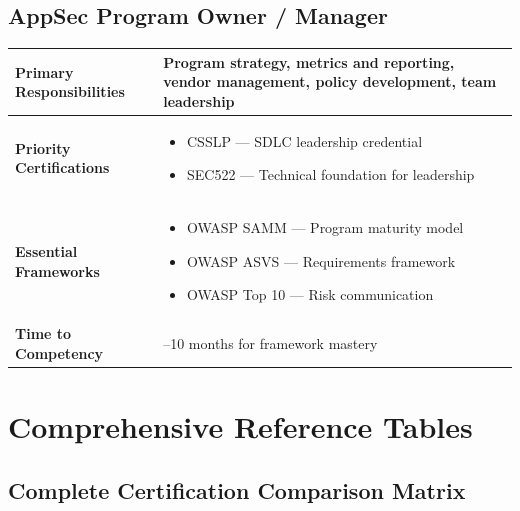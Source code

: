 \documentclass[11pt,letterpaper]{article}
\begin{document}
\subsection{AppSec Program Owner / Manager}

\begin{table}[H]
\centering
\begin{tabularx}{\textwidth}{l >{\raggedright\arraybackslash}X}
\toprule
\textbf{Primary Responsibilities} & Program strategy, metrics and reporting, vendor management, policy development, team leadership \\
\midrule
\textbf{Priority Certifications} & \begin{itemize}[nosep,leftmargin=*]
    \item CSSLP --- SDLC leadership credential
    \item SEC522 --- Technical foundation for leadership
\end{itemize} \\
\midrule
\textbf{Essential Frameworks} & \begin{itemize}[nosep,leftmargin=*]
    \item OWASP SAMM --- Program maturity model
    \item OWASP ASVS --- Requirements framework
    \item OWASP Top 10 --- Risk communication
\end{itemize} \\
\midrule
\textbf{Time to Competency} & 6--10 months for framework mastery \\
\bottomrule
\end{tabularx}
\end{table}

\newpage

\section{Comprehensive Reference Tables}

\subsection{Complete Certification Comparison Matrix}
\end{document}
